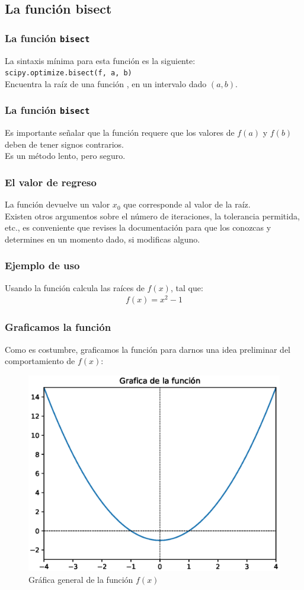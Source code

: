 \subsection{La función bisect}
\begin{frame}[fragile]
\frametitle{La función \texttt{bisect}}
La sintaxis mínima para esta función es la siguiente:
\\
\verb|scipy.optimize.bisect(f, a, b)|
\\
Encuentra la raíz de una función , en un intervalo dado $(a, b)$.
\end{frame}
\begin{frame}[fragile]
\frametitle{La función \texttt{bisect}}
Es importante señalar que la función requere que los valores de $f(a)$ y $f (b)$ deben de tener signos contrarios.
\\
\bigskip
Es un método lento, pero seguro.
\end{frame}
\begin{frame}[fragile]
\frametitle{El valor de regreso}
La función  devuelve un valor $x_{0}$ que corresponde al valor de la raíz.
\\
\bigskip
\pause
Existen otros argumentos sobre el número de iteraciones, la tolerancia permitida, etc., es conveniente que revises la documentación para que los conozcas y determines en un momento dado, si modificas alguno.
\end{frame}
\begin{frame}[fragile]
\frametitle{Ejemplo de uso}
Usando la función  calcula las raíces de $f(x)$, tal que:
\begin{align*}
f(x) =  x^{2} - 1
\end{align*}
\end{frame}
\begin{frame}
\frametitle{Graficamos la función}
Como es costumbre, graficamos la función para darnos una idea preliminar del comportamiento de $f(x)$:
\begin{figure}[h!]
    \centering
    \includegraphics[scale=0.4]{Imagenes/raices_scipy_bisect_01.eps}
    \caption{Gráfica general de la función $f(x)$}
\end{figure}
\end{frame}
